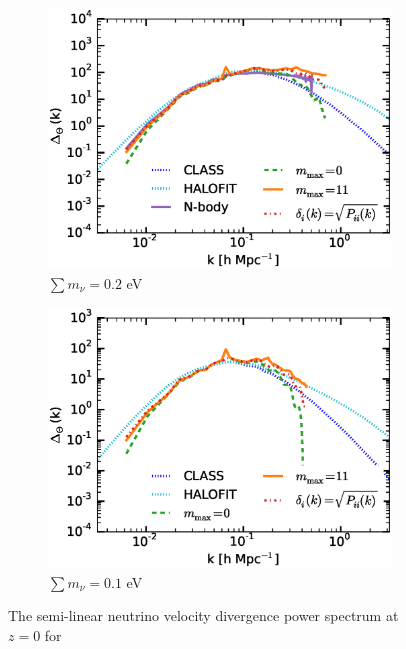 \documentclass{aastex}
\begin{document}
\begin{figure}[h!]
  \centering
  \begin{subfigure}[t]{0.45\textwidth}
    \centering
    \includegraphics[width=\textwidth]{Figures/vel_nu0p2_0.eps}
    \caption{$\sum m_\nu = 0.2$ eV}\label{fig:vel_nu0p2_rec}
  \end{subfigure}
  \begin{subfigure}[t]{0.45\textwidth}
  \centering
    \includegraphics[width=\textwidth]{Figures/vel_nu0p1_0.eps}
    \caption{$\sum m_\nu = 0.1$ eV}\label{fig:vel_nu0p05_rec}
    \end{subfigure}
    \caption{The semi-linear neutrino velocity divergence power
      spectrum at $z=0$ for
}
\end{figure}
\end{document}
